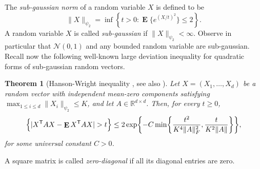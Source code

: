 \documentclass[letterpaper]{amsart}
\newcommand{\sN}{\mathcal{N}}
\newcommand{\R}{\mathbb{R}}
\DeclareMathOperator{\E}{\mathbf{E}}
\let\Pr\relax
\DeclareMathOperator{\Pr}{\mathbf{P}}
\let\originalleft\left
\let\originalright\right
\def\left#1{\mathopen{}\originalleft#1}
\def\right#1{\originalright#1\mathclose{}}
\newtheorem{thm}{Theorem}{\bfseries}{\itshape}
\newcommand{\thmlabel}[1]{\label{thm:#1}}
\numberwithin{thm}{section}
\theoremstyle{definition}
\theoremstyle{plain}
\newcommand{\transpose}{^{\mathsf{T}}}
\begin{document}
The \emph{sub-gaussian norm} of a random variable $X$ is defined to be
\[
	\|X\|_{\psi_2} = \inf\left\{ t > 0 \colon \E\{e^{(X/t)^2}\} \le 2 \right\} .
\]
A random variable $X$ is called \emph{sub-gaussian} if
$\|X\|_{\psi_2} < \infty$. Observe in particular that $\sN(0, 1)$ and
any bounded random variable are sub-gaussian. Recall now the following
well-known large deviation inequality for quadratic forms of
sub-gaussian random vectors.
\begin{thm}[Hanson-Wright inequality 
  ,
  see also ]\thmlabel{hanson-wright}
  Let $X = (X_1, \dots, X_d)$ be a random vector with independent
  mean-zero components satisfying
  $\max_{1 \le i \le d} \|X_i\|_{\psi_2} \le K$, and let
  $A \in \R^{d \times d}$. Then, for every $t \ge 0$,
  \[
    \Pr\Big\{ |X\transpose A X - \E X\transpose A X| > t \Big\} \le 2
    \exp\left\{ - C \min \left\{ \frac{t^2}{K^4 \|A\|_F^2},
        \frac{t}{K^2 \|A\|} \right\}\right\} ,
  \]
  for some universal constant $C > 0$.
\end{thm}

A square matrix is called \emph{zero-diagonal} if all its diagonal
entries are zero.
\end{document}
